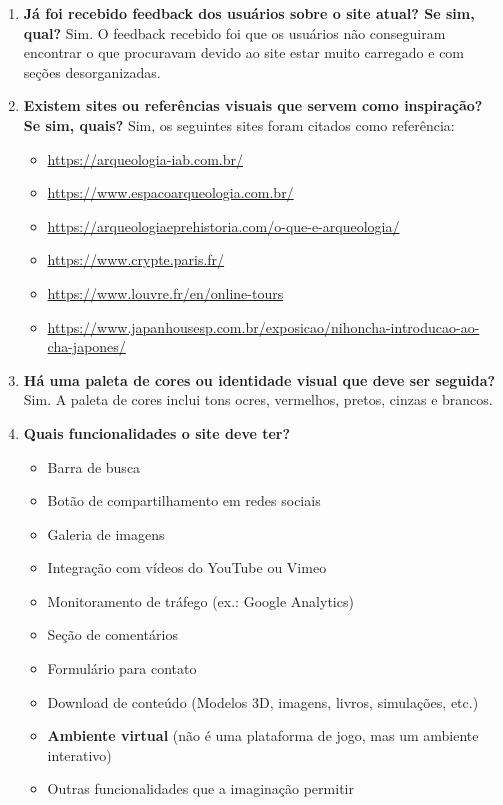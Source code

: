 \begin{enumerate}
    \item \textbf{Já foi recebido feedback dos usuários sobre o site atual? Se sim, qual?}  
    Sim. O feedback recebido foi que os usuários não conseguiram encontrar o que procuravam devido ao site estar muito carregado e com seções desorganizadas.

    \item \textbf{Existem sites ou referências visuais que servem como inspiração? Se sim, quais?}  
    Sim, os seguintes sites foram citados como referência:  
    \begin{itemize}
        \item \url{https://arqueologia-iab.com.br/}  
        \item \url{https://www.espacoarqueologia.com.br/}  
        \item \url{https://arqueologiaeprehistoria.com/o-que-e-arqueologia/}  
        \item \url{https://www.crypte.paris.fr/}  
        \item \url{https://www.louvre.fr/en/online-tours}  
        \item \url{https://www.japanhousesp.com.br/exposicao/nihoncha-introducao-ao-cha-japones/}
    \end{itemize}

    \item \textbf{Há uma paleta de cores ou identidade visual que deve ser seguida?}  
    Sim. A paleta de cores inclui tons ocres, vermelhos, pretos, cinzas e brancos.

    \item \textbf{Quais funcionalidades o site deve ter?}  
    \begin{itemize}
        \item Barra de busca  
        \item Botão de compartilhamento em redes sociais  
        \item Galeria de imagens  
        \item Integração com vídeos do YouTube ou Vimeo  
        \item Monitoramento de tráfego (ex.: Google Analytics)  
        \item Seção de comentários  
        \item Formulário para contato  
        \item Download de conteúdo (Modelos 3D, imagens, livros, simulações, etc.)  
        \item \textbf{Ambiente virtual} (não é uma plataforma de jogo, mas um ambiente interativo)  
        \item Outras funcionalidades que a imaginação permitir
    \end{itemize}


\end{enumerate}
